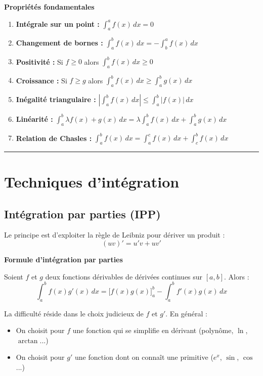 \documentclass[../PolyS2.tex]{subfiles}
\begin{document}
\begin{Prop}\textbf{Propriétés fondamentales}

\begin{enumerate}
\item \textbf{Intégrale sur un point :} $\displaystyle\int_a^a f(x) \, dx = 0$
\item \textbf{Changement de bornes :} $\displaystyle\int_a^b f(x) \, dx = -\int_b^a f(x) \, dx$
\item \textbf{Positivité :} Si $f \geq 0$ alors $\displaystyle\int_a^b f(x) \, dx \geq 0$
\item \textbf{Croissance :} Si $f \geq g$ alors $\displaystyle\int_a^b f(x) \, dx \geq \int_a^b g(x) \, dx$
\item \textbf{Inégalité triangulaire :} $\displaystyle\left|\int_a^b f(x) \, dx\right| \leq \int_a^b |f(x)| \, dx$
\item \textbf{Linéarité :} $\displaystyle\int_a^b \lambda f(x) + g(x) \, dx = \lambda \int_a^b f(x) \, dx + \int_a^b g(x) \, dx$
\item \textbf{Relation de Chasles :} $\displaystyle\int_a^b f(x) \, dx = \int_a^c f(x) \, dx + \int_c^b f(x) \, dx$
\end{enumerate}
\end{Prop}

\vspace{1em}\hrule\vspace{1em}

\section{Techniques d'intégration}

\subsection{Intégration par parties (IPP)}

Le principe est d'exploiter la règle de Leibniz pour dériver un produit :
$$(uv)' = u'v + uv'$$

\begin{Thm}\textbf{Formule d'intégration par parties}

Soient $f$ et $g$ deux fonctions dérivables de dérivées continues sur $[a,b]$. Alors :
$$\int_a^b f(x) g'(x) \, dx = \big[f(x) g(x)\big]_a^b - \int_a^b f'(x) g(x) \, dx$$
\end{Thm}

\begin{Rmq}
La difficulté réside dans le choix judicieux de $f$ et $g'$. En général :
\begin{itemize}
\item On choisit pour $f$ une fonction qui se simplifie en dérivant (polynôme, $\ln$, $\arctan$...)
\item On choisit pour $g'$ une fonction dont on connaît une primitive ($e^x$, $\sin$, $\cos$...)
\end{itemize}
\end{Rmq}
\end{document}
